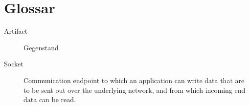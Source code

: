 \chapter{Glossar}

\begin{description}
  \item[Artifact] Gegenstand
  \item[Socket] Communication endpoint to which an application can write data
that are to be sent out over the underlying network, and from which incoming end
data can be read. \cite{TAN06}
\end{description} 

